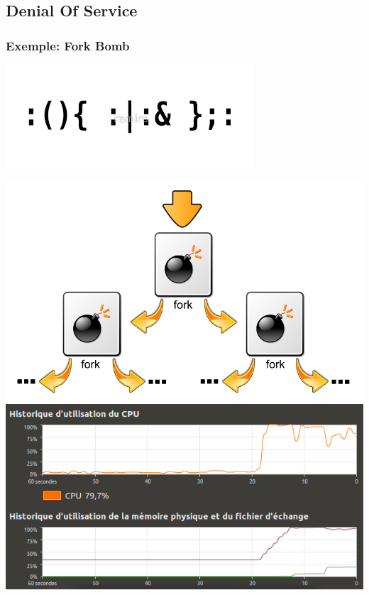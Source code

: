 \subsection{Denial Of Service}
\begin{frame}
\frametitle{Exemple: Fork Bomb}

\begin{center}
\includegraphics[scale=0.55]{res/bash_fork}
\end{center}

\includegraphics[scale=0.24]{res/fork_bomb}
\includegraphics[scale=0.24]{res/DoS}

\end{frame}




